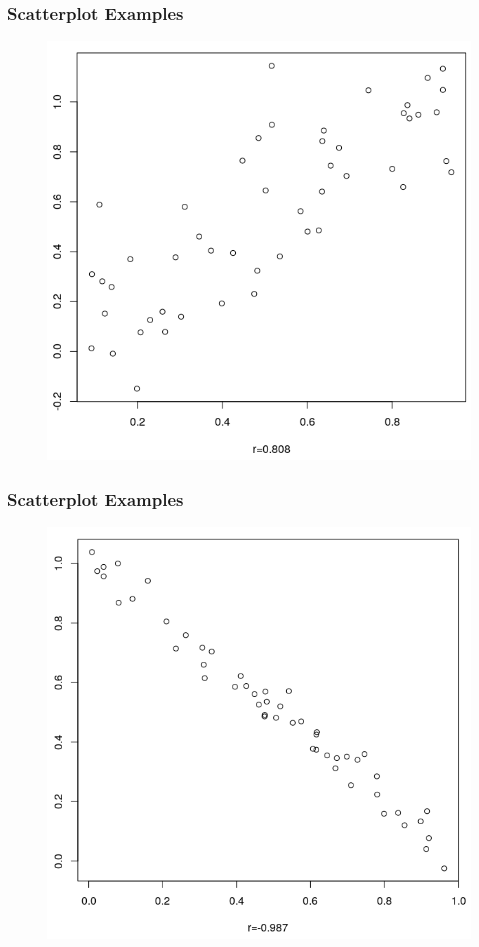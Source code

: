 \documentclass[xcolor=dvipsnames]{beamer}
\begin{document}
\begin{frame}
  \frametitle{Scatterplot Examples}
  \begin{figure}[h]
    \includegraphics[scale=0.35]{./diagrams/sc01.png}
  \end{figure}
\end{frame}

\begin{frame}
  \frametitle{Scatterplot Examples}
  \begin{figure}[h]
    \includegraphics[scale=0.35]{./diagrams/sc02.png}
  \end{figure}
\end{frame}
\end{document}
